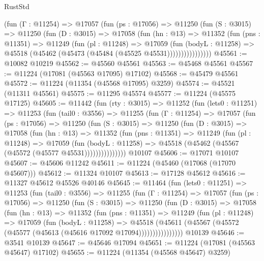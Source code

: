 \begin{lexlean}{RustStd}
\begin{coremodule}
            (fun (Γ : @11254) =>
            @17057
              (fun (ps : @17056) =>
              @11250
                (fun (S : @3015) =>
                @11250
                  (fun (D : @3015) =>
                  @17058
                    (fun (hn : @13) =>
                    @11352
                      (fun (pns : @11351) =>
                      @11249
                        (fun (pl : @11248) =>
                        @17059
                          (fun (bodyL : @11258) =>
                          @45518 (@45462 (@45473 (@45484 (@45525 @45531))))))))))))))))
@45561 := @10082 @10219
@45562 := @45560 @45561
@45563 := @45468 @45561
@45567 := @11224 (@17081 (@45563 @17095) @17102)
@45568 := @45479 @45561
@45572 := @11224 (@11354 (@45568 @17095) @3259)
@45574 := @45521 (@11311 @45561)
@45575 := @11295 @45574
@45577 := @11224 (@45575 @17125)
@45605 := @11442
    (fun (rty : @3015) =>
    @11252
      (fun (lets0 : @11251) =>
      @11253
        (fun (tail0 : @3556) =>
        @11255
          (fun (Γ : @11254) =>
          @17057
            (fun (ps : @17056) =>
            @11250
              (fun (S : @3015) =>
              @11250
                (fun (D : @3015) =>
                @17058
                  (fun (hn : @13) =>
                  @11352
                    (fun (pns : @11351) =>
                    @11249
                      (fun (pl : @11248) =>
                      @17059
                        (fun (bodyL : @11258) =>
                        @45518 (@45462 (@45567 (@45572 (@45577 @45531)))))))))))))))
    @10107
@45606 := @17071 @10107
@45607 := @45606 @11242
@45611 := @11224 (@45460 (@17068 (@17070 @45607)))
@45612 := @11324 @10107
@45613 := @17128 @45612
@45616 := @11327 @45612 @45526 @40146
@45645 := @11464
    (fun (lets0 : @11251) =>
    @11253
      (fun (tail0 : @3556) =>
      @11255
        (fun (Γ : @11254) =>
        @17057
          (fun (ps : @17056) =>
          @11250
            (fun (S : @3015) =>
            @11250
              (fun (D : @3015) =>
              @17058
                (fun (hn : @13) =>
                @11352
                  (fun (pns : @11351) =>
                  @11249
                    (fun (pl : @11248) =>
                    @17059
                      (fun (bodyL : @11258) =>
                      @45518
                        (@45611
                          (@45567 (@45572 (@45577 (@45613 (@45616 @17092 @17094))))))))))))))))
    @10139
@45646 := @3541 @10139
@45647 := @45646 @17094
@45651 := @11224 (@17081 (@45563 @45647) @17102)
@45655 := @11224 (@11354 (@45568 @45647) @3259)

\end{coremodule}
\end{lexlean}
